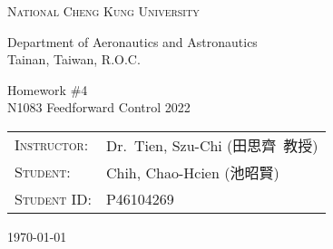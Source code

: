 \begin{titlepage}
    \vspace*{1cm}
    \makeatletter
    \renewcommand{\thefootnote}{\@fnsymbol\c@footnote}
    \makeatother
    \setlength{\parindent}{0pt}
    \vspace{\baselineskip}

    {\LARGE \textsc{National Cheng Kung University}\par}
    {\Large Department of Aeronautics and Astronautics \\ Tainan, Taiwan, R.O.C.\par}

    \vspace{15em}

    {\Large {Homework \#4} \\ N1083 Feedforward Control 2022\par}

    \vspace{5em}

    \hfill\parbox{.9\linewidth}{%
        {
            \fontsize{12pt}{16pt}\selectfont
            \begin{tabular}{ll}
                \textsc{\Large Instructor}: & {Dr.~Tien, Szu-Chi (田思齊~教授)}\\
                \textsc{\Large Student:} & {Chih, Chao-Hcien (池昭賢)}\\
                \textsc{\Large Student ID:} & P46104269
            \end{tabular}
            }\par
    }\par
    \vspace{1em}
    \vspace{4\baselineskip}
    \today\par


\end{titlepage}